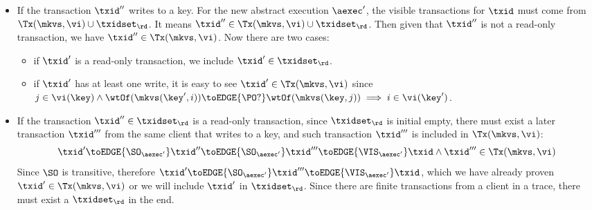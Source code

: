 \begin{itemize}
\item If the transaction \( \txid'' \) writes to a key.
For the new abstract execution \( \aexec' \), the visible transactions for \( \txid \) must come from \( \Tx(\mkvs, \vi) \cup \txidset_\rd \).
It means \( \txid'' \in \Tx(\mkvs, \vi) \cup \txidset_\rd  \).
Then given that \( \txid'' \) is not a read-only transaction, we have \( \txid'' \in \Tx(\mkvs, \vi) \).
Now there are two cases:
\begin{itemize}
    \item if \( \txid' \) is a read-only transaction, we include \( \txid' \in \txidset_{\rd} \).
    \item if \( \txid' \) has at least one write, it is easy to see \( \txid' \in \Tx(\mkvs, \vi) \) since \( j \in \vi(\key) \wedge \wtOf(\mkvs(\key', i)) \toEDGE{\PO?} \wtOf(\mkvs(\key, j)) \implies i \in \vi(\key') \).
\end{itemize}
\item If the transaction \( \txid'' \in \txidset_\rd \) is a read-only transaction, 
since \( \txidset_\rd \) is initial empty, there must exist a later transaction \( \txid''' \) from the same client that writes to a key,
and such transaction \( \txid''' \) is included in \( \Tx(\mkvs, \vi) \):
\[
    \txid' \toEDGE{\SO_{\aexec'}} \txid'' 
    \toEDGE{\SO_{\aexec'}} \txid''' \toEDGE{\VIS_{\aexec'}} \txid 
    \land \txid''' \in \Tx(\mkvs,\vi)
\]
Since \( \SO \) is transitive, 
therefore \( \txid' \toEDGE{\SO_{\aexec'}} \txid''' \toEDGE{\VIS_{\aexec'}} \txid \),
which we have already proven \( \txid' \in \Tx(\mkvs, \vi) \) or we will include \( \txid' \) in \( \txidset_\rd \).
Since there are finite transactions from a client in a trace, there must exist a \( \txidset_\rd \) in the end.
\end{itemize}


